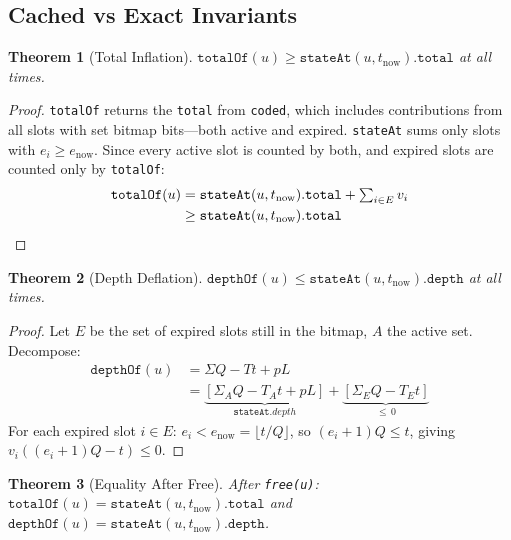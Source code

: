 \documentclass[10pt,a4paper,twocolumn]{article}
\theoremstyle{definition}
\theoremstyle{plain}
\newtheorem{theorem}{Theorem}[section]
\theoremstyle{remark}
\begin{document}
\subsection{Cached vs Exact Invariants}

\begin{theorem}[Total Inflation]
\label{thm:total-inflation}
$\texttt{totalOf}(u) \geq \texttt{stateAt}(u, t_{\text{now}}).\texttt{total}$ at all times.
\end{theorem}

\begin{proof}
\texttt{totalOf} returns the \texttt{total} from \texttt{coded}, which includes contributions from all slots with set bitmap bits---both active and expired. \texttt{stateAt} sums only slots with $e_i \geq e_{\text{now}}$. Since every active slot is counted by both, and expired slots are counted only by \texttt{totalOf}:
\begin{align*}
\texttt{totalOf}(u) &= \texttt{stateAt}(u,t_{\text{now}}).\texttt{total} + \textstyle\sum_{i \in E} v_i \\
                     &\geq \texttt{stateAt}(u,t_{\text{now}}).\texttt{total} \qedhere
\end{align*}
\end{proof}

\begin{theorem}[Depth Deflation]
\label{thm:depth-deflation}
$\texttt{depthOf}(u) \leq \texttt{stateAt}(u, t_{\text{now}}).\texttt{depth}$ at all times.
\end{theorem}

\begin{proof}
Let $E$ be the set of expired slots still in the bitmap, $A$ the active set. Decompose:
\begin{align*}
\texttt{depthOf}(u) &= \Sigma Q - Tt + pL \\
    &= \underbrace{[\Sigma_A Q - T_A t + pL]}_{\texttt{stateAt}.depth} + \underbrace{[\Sigma_E Q - T_E t]}_{\leq\, 0}
\end{align*}
For each expired slot $i \in E$: $e_i < e_{\text{now}} = \lfloor t/Q \rfloor$, so $(e_i{+}1)Q \leq t$, giving $v_i((e_i{+}1)Q - t) \leq 0$.
\end{proof}

\begin{theorem}[Equality After Free]
\label{thm:equality-after-free}
After \texttt{free(u)}: $\texttt{totalOf}(u) = \texttt{stateAt}(u, t_{\text{now}}).\texttt{total}$ and $\texttt{depthOf}(u) = \texttt{stateAt}(u, t_{\text{now}}).\texttt{depth}$.
\end{theorem}
\end{document}
